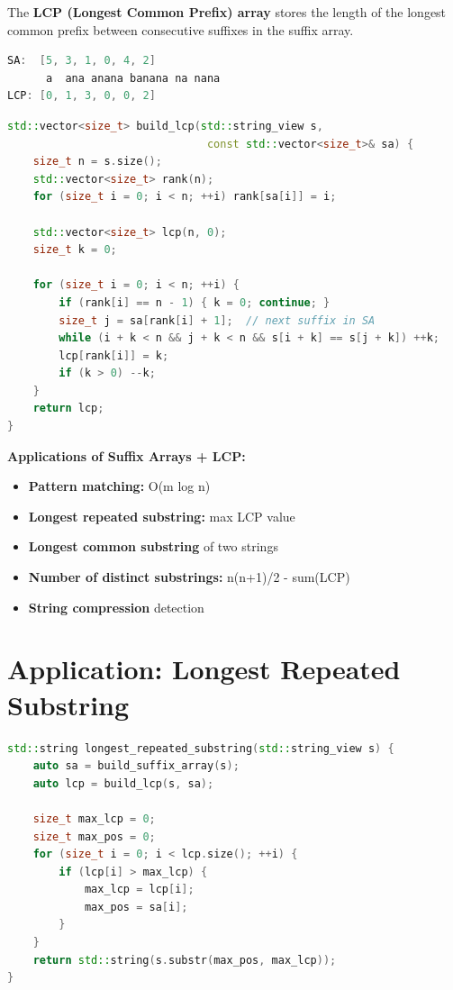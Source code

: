 The \textbf{LCP (Longest Common Prefix) array} stores the length of the longest common prefix between consecutive suffixes in the suffix array.

\begin{lstlisting}[language=Java]
SA:  [5, 3, 1, 0, 4, 2]
      a  ana anana banana na nana
LCP: [0, 1, 3, 0, 0, 2]
\end{lstlisting}

\begin{lstlisting}[language=C++]
std::vector<size_t> build_lcp(std::string_view s,
                               const std::vector<size_t>& sa) {
    size_t n = s.size();
    std::vector<size_t> rank(n);
    for (size_t i = 0; i < n; ++i) rank[sa[i]] = i;

    std::vector<size_t> lcp(n, 0);
    size_t k = 0;

    for (size_t i = 0; i < n; ++i) {
        if (rank[i] == n - 1) { k = 0; continue; }
        size_t j = sa[rank[i] + 1];  // next suffix in SA
        while (i + k < n && j + k < n && s[i + k] == s[j + k]) ++k;
        lcp[rank[i]] = k;
        if (k > 0) --k;
    }
    return lcp;
}
\end{lstlisting}

\textbf{Applications of Suffix Arrays + LCP:}
\begin{itemize}
\item \textbf{Pattern matching:} O(m log n)
\item \textbf{Longest repeated substring:} max LCP value
\item \textbf{Longest common substring} of two strings
\item \textbf{Number of distinct substrings:} n(n+1)/2 - sum(LCP)
\item \textbf{String compression} detection
\end{itemize}

\section{Application: Longest Repeated Substring}

\begin{lstlisting}[language=C++]
std::string longest_repeated_substring(std::string_view s) {
    auto sa = build_suffix_array(s);
    auto lcp = build_lcp(s, sa);

    size_t max_lcp = 0;
    size_t max_pos = 0;
    for (size_t i = 0; i < lcp.size(); ++i) {
        if (lcp[i] > max_lcp) {
            max_lcp = lcp[i];
            max_pos = sa[i];
        }
    }
    return std::string(s.substr(max_pos, max_lcp));
}
\end{lstlisting}

